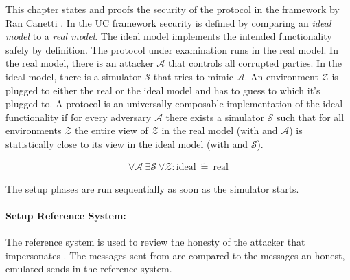 \label{sec:security}

This chapter states and proofs the security of the protocol in the
 framework by Ran Canetti \cite{canetti05}.
In the UC framework security is defined by comparing an \emph{ideal model} to a
\emph{real model}. The ideal model implements the intended functionality
\JWfuncSym{}{} safely by definition. The protocol under examination runs in the
real model. In the real model, there is an attacker $\mathcal{A}$ that controls
all corrupted parties.  In the ideal model, there is a simulator $\mathcal{S}$
that tries to mimic $\mathcal{A}$. An environment $\mathcal{Z}$ is plugged to
either the real or the ideal model and has to guess to which it's plugged to. A
protocol \JWprotoSym{}{} is an universally composable implementation of the
ideal functionality if for every adversary $\mathcal{A}$ there exists a
simulator $\mathcal{S}$ such that for all environments $\mathcal{Z}$ the entire
view of $\mathcal{Z}$ in the real model (with \JWprotoSym{}{} and $\mathcal{A}$)
is statistically close to its view in the ideal model (with \JWfuncSym{}{} and
$\mathcal{S}$).

\begin{align*}
%
\forall \mathcal{A}\ \exists \mathcal{S}\ \forall \mathcal{Z} :
\text{ideal}\ \widetilde{=}\ \text{real}
%
\end{align*}

%
%
\label{sec:simulators}


\label{sec:simulator-david}

The setup phases are run sequentially as soon as the simulator starts.

\paragraph{Setup Reference System:}

The reference system is used to review the honesty of the attacker \JWadv{}
that impersonates \JWpTwo{}. The messages sent from \JWadv{} are compared
to the messages an honest, emulated \JWpTwo{} sends in the reference system.

